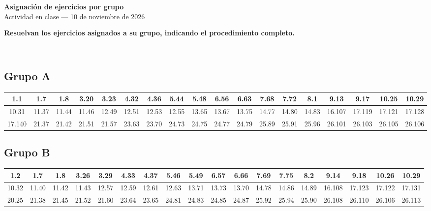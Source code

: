 \documentclass[10pt,letterpaper,landscape]{article}
\begin{document}
\begin{center}{\Large\bfseries Asignación de ejercicios por grupo}\\[3pt]
Actividad en clase --- 10 de noviembre de 2026\end{center}

\noindent \begin{centering}\textbf{Resuelvan los ejercicios asignados a su grupo, indicando el procedimiento completo.}\end{centering}\\[8pt]
\subsection*{\textcolor{azul}{Grupo A}}
\begin{center}\footnotesize
\begin{tabular}{||c|c|c|c|c|c|c|c|c|c|c|c|c|c|c|c|c|c||}
\hline\hline
 1.1 & 1.7 & 1.8 & 3.20 & 3.23 & 4.32  & 4.36 & 5.44 & 5.48 &  6.56 & 6.63 & 7.68 & 7.72 & 8.1 & 9.13 & 9.17 & 10.25 & 10.29 \\ \hline\hline
10.31 & 11.37 & 11.44 & 11.46 & 12.49 & 12.51 & 12.53 & 12.55 & 13.65 & 13.67 & 13.75 & 14.77 & 14.80 & 14.83 & 16.107 & 17.119 & 17.121 & 17.128 \\ \hline\hline
17.140 & 21.37 & 21.42 & 21.51 & 21.57 & 23.63 & 23.70 & 24.73 & 24.75 & 24.77 & 24.79 & 25.89 & 25.91 & 25.96 & 26.101 & 26.103 & 26.105 & 26.106  \\ \hline\hline
\end{tabular}
\end{center}
\vspace{5pt}

\subsection*{\textcolor{azul}{Grupo B}}
\begin{center}\footnotesize
\begin{tabular}{||c|c|c|c|c|c|c|c|c|c|c|c|c|c|c|c|c|c||}
\hline\hline
1.2 & 1.7 & 1.8 & 3.26 & 3.29 & 4.33 & 4.37 & 5.46 & 5.49 & 6.57 & 6.66 & 7.69 & 7.75 & 8.2 & 9.14 & 9.18 & 10.26 & 10.29 \\ \hline\hline
10.32 & 11.40 & 11.42 & 11.43 & 12.57 & 12.59 & 12.61 & 12.63 & 13.71 & 13.73 & 13.70 & 14.78 & 14.86 & 14.89 & 16.108 & 17.123 & 17.122 & 17.131 \\ \hline\hline
20.25 & 21.38 & 21.45 & 21.52 & 21.60 & 23.64 & 23.65 & 24.81 & 24.83 & 24.85 & 24.87 & 25.92 & 25.94 & 25.90 & 26.108 & 26.110 &26.106 & 26.113\\ \hline \hline
\end{tabular}
\end{center}
\vspace{5pt}
\end{document}
